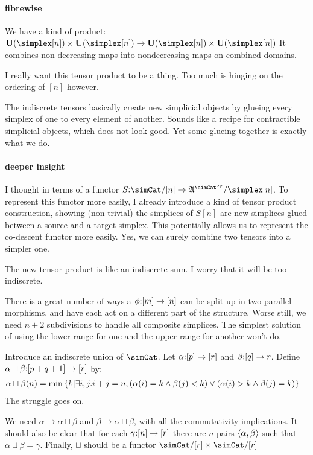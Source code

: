 \documentclass[csh.tex]{subfiles}
\begin{document}
\paragraph{fibrewise}
We have a kind of product:
$\base(\simplex[n])\times\base(\simplex[n]) \to \base(\simplex[n])\times\base(\simplex[n])$
It combines non decreasing maps into nondecreasing maps on combined domains.

I really want this tensor product to be a thing. Too much is hinging on the ordering of $[n]$ however.

The indiscrete tensors basically create new simplicial objects by glueing every simplex of one to every element of another. Sounds like a recipe for contractible simplicial objects, which does not look good. Yet some glueing together is exactly what we do.

\paragraph{deeper insight}
I thought in terms of a functor $S\of \simCat/[n]\to \ambient\s/\simplex[n]$. To represent this functor more easily, I already introduce a kind of tensor product construction, showing (non trivial) the simplices of $S[n]$ are new simplices glued between a source and a target simplex. This potentially allows us to represent the co-descent functor more easily. Yes, we can surely combine two tensors into a simpler one.

The new tensor product is like an indiscrete sum. I worry that it will be too indiscrete.

There is a great number of ways a $\phi\mathord :[m]\to[n]$ can be split up in two parallel morphisms, and have each act on a different part of the structure. Worse still, we need $n+2$ subdivisions to handle all composite simplices. The simplest solution of using the lower range for one and the upper range for another won't do.

Introduce an indiscrete union of $\simCat$.
Let $\alpha\mathord :[p]\to[r]$ and $\beta\mathord :[q]\to r$. Define
$\alpha\sqcup\beta\mathord :[p+q+1]\to [r]$ by:
\begin{align*}
\alpha\sqcup\beta(n) &= \min\left\{ k | \exists i,j. i + j = n, (\alpha(i) = k \land \beta(j) < k ) \lor (\alpha(i) > k \land \beta(j) = k )\right\}
\end{align*}
The struggle goes on.

We need $\alpha \to \alpha\sqcup\beta$ and $\beta \to \alpha\sqcup\beta$, with all the commutativity implications. It should also be clear that for each $\gamma\mathord :[n]\to [r]$ there are $n$ pairs $\left\langle \alpha,\beta \right\rangle$ such that $\alpha\sqcup\beta = \gamma$. Finally, $\sqcup$ should be a functor $\simCat/[r]\times\simCat/[r]$
\end{document}
